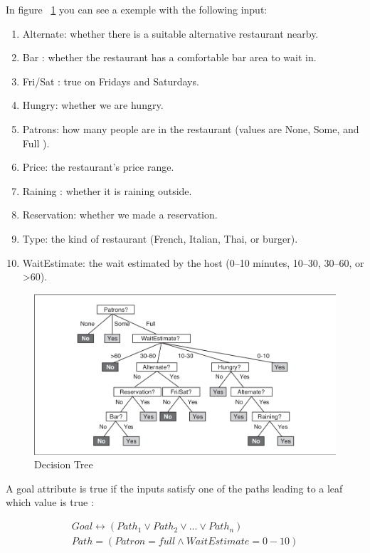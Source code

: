 In figure ~\ref{decisionTree} you can see a exemple with the following input:
\begin{enumerate}
\item Alternate: whether there is a suitable alternative restaurant nearby.
\item Bar : whether the restaurant has a comfortable bar area to wait in.
\item Fri/Sat : true on Fridays and Saturdays.
\item Hungry: whether we are hungry.
\item Patrons: how many people are in the restaurant (values are None, Some, and Full ).
\item Price: the restaurant’s price range.
\item Raining : whether it is raining outside.
\item Reservation: whether we made a reservation.
\item Type: the kind of restaurant (French, Italian, Thai, or burger).
\item WaitEstimate: the wait estimated by the host (0–10 minutes, 10–30, 30–60, or >60).
\end{enumerate} 

\begin{figure}[h]
    \centering
    \includegraphics[width=14cm]{decisionTree.png}
    \caption{Decision Tree}
    \label{decisionTree}
\end{figure}

A goal attribute is true if the inputs satisfy one of the paths leading to a leaf which value is true :

\begin{align}
Goal \leftrightarrow (Path_1 \lor Path_2 \lor ... \lor Path_n) \\
Path = ( Patron = full \land WaitEstimate = 0-10 )
\end{align}

